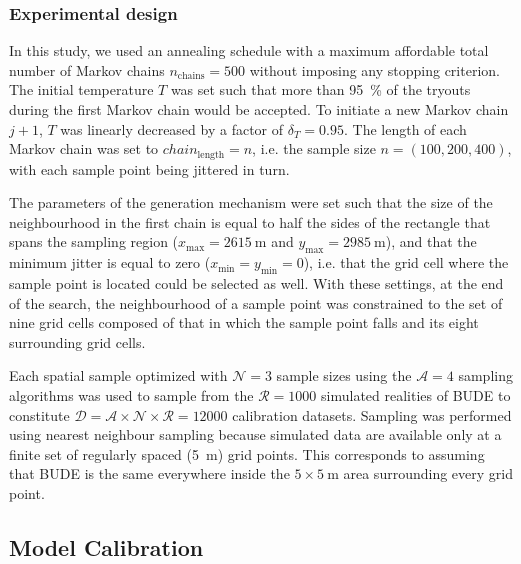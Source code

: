\subsubsection{Experimental design}

In this study, we used an annealing schedule with a maximum affordable total number of Markov chains 
$n_\text{chains} = 500$ without imposing any stopping criterion. The initial temperature $T$ was set such that 
more than \SI{95}{\percent} of the tryouts during the first Markov chain would be accepted. To initiate a new 
Markov chain $j + 1$, $T$ was linearly decreased by a factor of $\delta_{T} = 0.95$. The length of each Markov 
chain was set to $chain_\text{length} = n$, i.e. the sample size $n = (100, 200, 400)$, with each sample point 
being jittered in turn.

The parameters of the generation mechanism were set such that the size of the neighbourhood in the first chain 
is equal to half the sides of the rectangle that spans the sampling region ($x_\text{max} = \SI{2615}{\m}$ and 
$y_\text{max} = \SI{2985}{\m}$), and that the minimum jitter is equal to zero ($x_\text{min} = y_\text{min} = 
0$), i.e. that the grid cell where the sample point is located could be selected as well. With these settings, 
at the end of the search, the neighbourhood of a sample point was constrained to the set of nine grid cells 
composed of that in which the sample point falls and its eight surrounding grid cells.

Each spatial sample optimized with $\mathcal{N} = 3$ sample sizes using the $\mathcal{A} = 4$ sampling 
algorithms was used to sample from the $\mathcal{R} = 1000$ simulated realities of BUDE to constitute 
$\mathcal{D} = \mathcal{A} \times \mathcal{N} \times \mathcal{R} = \num{12000}$ calibration datasets. Sampling 
was performed using nearest neighbour sampling because simulated data are available only at a finite set of 
regularly spaced (\SI{5}{\m}) grid points. This corresponds to assuming that BUDE is the same everywhere 
inside the $5 \times \SI{5}{\m}$ area surrounding every grid point.

\subsection{Model Calibration}

